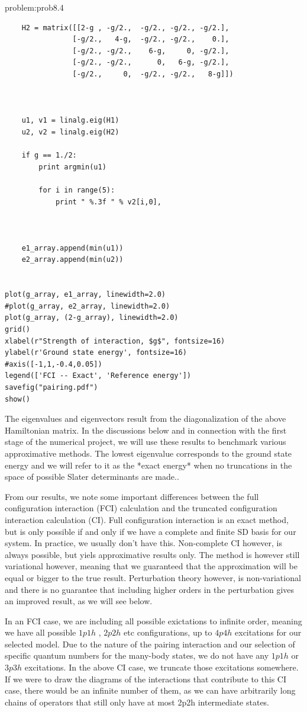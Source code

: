 \begin{sol}{problem:prob8.4}
\begin{lstlisting}
	H2 = matrix([[2-g , -g/2.,  -g/2., -g/2., -g/2.],
		        [-g/2.,   4-g,  -g/2., -g/2.,    0.],
		        [-g/2., -g/2.,    6-g,     0, -g/2.],
				[-g/2., -g/2.,      0,   6-g, -g/2.],
				[-g/2.,     0,  -g/2., -g/2.,   8-g]])



	u1, v1 = linalg.eig(H1)
	u2, v2 = linalg.eig(H2)

	if g == 1./2:
		print argmin(u1)

		for i in range(5):
			print " %.3f " % v2[i,0],



	e1_array.append(min(u1))
	e2_array.append(min(u2))


plot(g_array, e1_array, linewidth=2.0)
#plot(g_array, e2_array, linewidth=2.0)
plot(g_array, (2-g_array), linewidth=2.0)
grid()
xlabel(r"Strength of interaction, $g$", fontsize=16)
ylabel(r'Ground state energy', fontsize=16)
#axis([-1,1,-0.4,0.05])
legend(['FCI -- Exact', 'Reference energy'])
savefig("pairing.pdf")
show()
\end{lstlisting}
The eigenvalues and eigenvectors result from the diagonalization of the above Hamiltonian matrix.
In the discussions below and in connection with the first stage of the numerical project, we will use these results to benchmark various approximative methods.
The lowest eigenvalue corresponds to the ground state
energy and we will refer to it as the *exact energy* when no truncations in the space of possible Slater determinants are made..

From our results, we note some important differences between the full configuration interaction (FCI)
calculation and the truncated configuration interaction calculation (CI).
Full configuration interaction is an exact method, but is only
possible if and only if we have a complete and finite SD basis for our
system. In practice, we usually don't have this. Non-complete
CI however, is always possible, but yiels   approximative
results only. The method is however still variational however, meaning that we
guaranteed that the approximation will be equal or bigger to the true
result.
Perturbation theory however, is non-variational and there is no guarantee that including higher orders in the
perturbation gives an improved result, as we will see below.

In an FCI case, we are including all possible exictations to infinite
order, meaning we have all possible $1p1h$ , $2p2h$ etc configurations, up to $4p4h$
excitations for our selected model. Due to the nature of the pairing interaction and our selection
of specific quantum numbers for the many-body states, we do not have any $1p1h$ or $3p3h$ excitations.
In the above CI case, we truncate those excitations somewhere.
If we
were to draw the diagrams of the interactions that contribute to this
CI case, there would be an infinite number of them, as we can have
arbitrarily long chains of operators that still only have at most 2p2h
intermediate states.
\end{sol}


